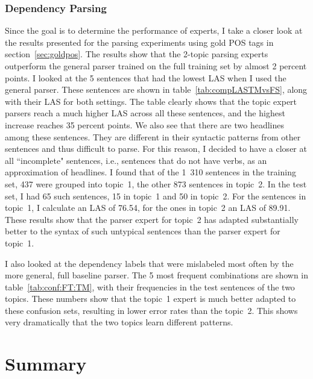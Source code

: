 \subsubsection*{Dependency Parsing}

Since the goal is to determine the performance of experts, I take a closer look at the results presented for the parsing experiments using gold POS tags in  section~\ref{sec:goldpos}. The results show that the 2-topic parsing experts outperform the general parser trained on the full training set by almost 2 percent points.  I looked at the 5 sentences that had the lowest LAS when I used the general parser. These sentences are shown in table~\ref{tab:compLASTMvsFS}, along with their LAS for both settings. The table clearly shows that the topic expert parsers reach a much higher LAS across all these sentences, and the highest increase reaches 35 percent points. We also see that there are two headlines among these sentences. They are different in their syntactic patterns from other sentences and thus difficult to parse. For this reason, I decided to have a closer at all ``incomplete" sentences, i.e., sentences that do not have verbs, as an approximation of headlines. I found that of the 1~310 sentences in the training set, 437 were grouped into topic~1, the other 873 sentences in topic~2. In the test set, I had 65 such sentences, 15 in topic~1 and 50 in topic~2. For the sentences in topic~1, I calculate an LAS of 76.54, for the ones in topic~2 an LAS of 89.91. These results show that the parser expert for topic~2 has adapted substantially better to the syntax of such untypical sentences than the parser expert for topic~1. 

I also looked at the dependency labels that were mislabeled most often by the more general, full baseline parser. The 5 most frequent combinations are shown in table~\ref{tab:conf:FT:TM}, with their frequencies in the test sentences of the two topics. These numbers show that the topic~1 expert is much better adapted to these confusion sets, resulting in lower error rates than the topic~2. This shows very dramatically that the two topics learn different patterns.

\section{Summary}

